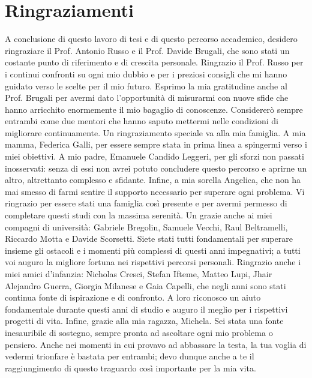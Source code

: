 \cleardoublepage %
\chapter*{Ringraziamenti}

A conclusione di questo lavoro di tesi e di questo percorso accademico, desidero ringraziare il Prof. Antonio Russo e il Prof. Davide Brugali, che sono stati un costante punto di riferimento e di crescita personale. Ringrazio il Prof. Russo per i continui confronti su ogni mio dubbio e per i preziosi consigli che mi hanno guidato verso le scelte per il mio futuro. Esprimo la mia gratitudine anche al Prof. Brugali per avermi dato l'opportunità di misurarmi con nuove sfide che hanno arricchito enormemente il mio bagaglio di conoscenze. Considererò sempre entrambi come due mentori che hanno saputo mettermi nelle condizioni di migliorare continuamente. Un ringraziamento speciale va alla mia famiglia. A mia mamma, Federica Galli, per essere sempre stata in prima linea a spingermi verso i miei obiettivi. A mio padre, Emanuele Candido Leggeri, per gli sforzi non passati inosservati: senza di essi non avrei potuto concludere questo percorso e aprirne un altro, altrettanto complesso e sfidante. Infine, a mia sorella Angelica, che non ha mai smesso di farmi sentire il supporto necessario per superare ogni problema. Vi ringrazio per essere stati una famiglia così presente e per avermi permesso di completare questi studi con la massima serenità. Un grazie anche ai miei compagni di università: Gabriele Bregolin, Samuele Vecchi, Raul Beltramelli, Riccardo Motta e Davide Scorsetti. Siete stati tutti fondamentali per superare insieme gli ostacoli e i momenti più complessi di questi anni impegnativi; a tutti voi auguro la migliore fortuna nei rispettivi percorsi personali. Ringrazio anche i miei amici d'infanzia: Nicholas Cresci, Stefan Ifteme, Matteo Lupi, Jhair Alejandro Guerra, Giorgia Milanese e Gaia Capelli, che negli anni sono stati continua fonte di ispirazione e di confronto. A loro riconosco un aiuto fondamentale durante questi anni di studio e auguro il meglio per i rispettivi progetti di vita. Infine, grazie alla mia ragazza, Michela. Sei stata una fonte inesauribile di sostegno, sempre pronta ad ascoltare ogni mio problema o pensiero. Anche nei momenti in cui provavo ad abbassare la testa, la tua voglia di vedermi trionfare è bastata per entrambi; devo dunque anche a te il raggiungimento di questo traguardo così importante per la mia vita.

